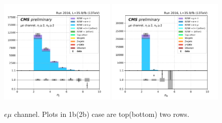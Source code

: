 \begin{figure}[ht]
    \includegraphics[width=0.49\textwidth]{chapters/Appendix/sectionPlots/figures/kinematics_pickles/emu/2b/emu_2b_nJets.pdf}
    \includegraphics[width=0.49\textwidth]{chapters/Appendix/sectionPlots/figures/kinematics_pickles/emu/2b/emu_2b_nBJets.pdf}
    
    \caption{$e\mu$ channel. Plots in 1b(2b) case are top(bottom) two rows.}
\end{figure}

